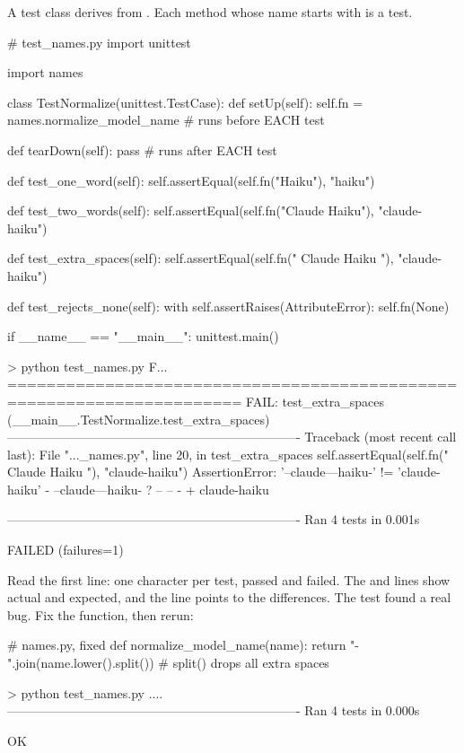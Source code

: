 A test class derives from . Each method whose name starts with  is a test.

\begin{pycode}
# test_names.py
import unittest

import names


class TestNormalize(unittest.TestCase):
    def setUp(self):
        self.fn = names.normalize_model_name   # runs before EACH test

    def tearDown(self):
        pass                                   # runs after EACH test

    def test_one_word(self):
        self.assertEqual(self.fn("Haiku"), "haiku")

    def test_two_words(self):
        self.assertEqual(self.fn("Claude Haiku"), "claude-haiku")

    def test_extra_spaces(self):
        self.assertEqual(self.fn("  Claude   Haiku "), "claude-haiku")

    def test_rejects_none(self):
        with self.assertRaises(AttributeError):
            self.fn(None)


if __name__ == "__main__":
    unittest.main()
\end{pycode}

\begin{rawcode}
> python test_names.py
F...
======================================================================
FAIL: test_extra_spaces (__main__.TestNormalize.test_extra_spaces)
----------------------------------------------------------------------
Traceback (most recent call last):
  File "...\test_names.py", line 20, in test_extra_spaces
    self.assertEqual(self.fn("  Claude   Haiku "), "claude-haiku")
AssertionError: '--claude---haiku-' != 'claude-haiku'
- --claude---haiku-
? --       --     -
+ claude-haiku

----------------------------------------------------------------------
Ran 4 tests in 0.001s

FAILED (failures=1)
\end{rawcode}

Read the first line: one character per test,  passed and  failed. The \code{-} and \code{+} lines show
actual and expected, and the  line points to the differences. The test found a real bug.
Fix the function, then rerun:

\begin{pycode}
# names.py, fixed
def normalize_model_name(name):
    return "-".join(name.lower().split())    # split() drops all extra spaces
\end{pycode}
\begin{rawcode}
> python test_names.py
....
----------------------------------------------------------------------
Ran 4 tests in 0.000s

OK
\end{rawcode}

